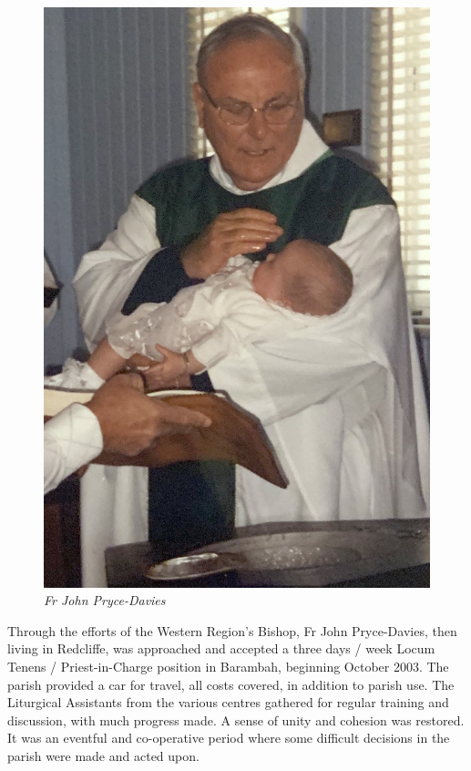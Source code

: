 \begin{figure}
\begin{center}
\includegraphics[width=.7\linewidth,center]{../images/JohnPryceDaviesWessling.jpg}
\caption{\itshape Fr John Pryce-Davies}
\end{center}
\end{figure}




Through the efforts of the Western Region's Bishop, Fr John Pryce-Davies, then living in Redcliffe, was approached and accepted a three days / week Locum Tenens / Priest-in-Charge position in Barambah, beginning October 2003. The parish provided a car for travel, all costs covered, in addition to parish use. The Liturgical Assistants from the various centres gathered for regular training and discussion, with much progress made. A sense of unity and cohesion was restored. It was an eventful and co-operative period where some difficult decisions in the parish were made and acted upon.









